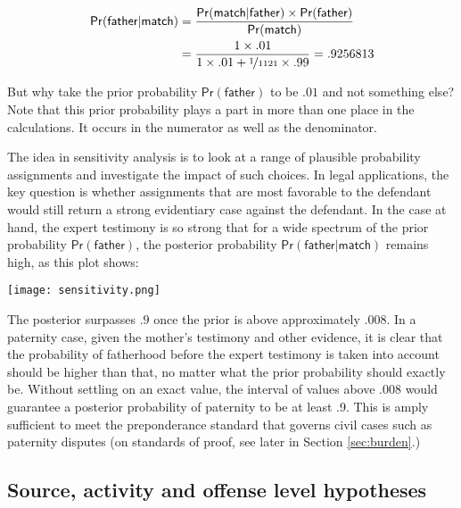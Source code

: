 \documentclass{article}
\newcommand{\pr}{\mathsf{Pr}}
\begin{document}
\begin{align*}
\pr(\textsf{father}\vert \textsf{match}) & = 
	\frac{
		\pr(\textsf{match}\vert \textsf{father}) \times \pr(\textsf{father})
		}
		{
		\pr(\textsf{match})
		} \\ &=
	\frac{
		1 \times  .01
	}
	{
		1 \times .01 + \nicefrac{1}{1121} \times .99
		}	= .9256813
	\end{align*}

\noindent But why take the prior probability $\pr(\textsf{father})$ to be $.01$ and not something else?
Note that this prior probability plays a part in more than one place in the calculations. It occurs in the numerator as well as the denominator. 
%

The idea in sensitivity analysis is to look at a range of plausible probability assignments and investigate the impact of such choices.
In legal applications, the key question is whether assignments that are most favorable to the defendant would still return a strong evidentiary case against the defendant. 
In the case at hand, the expert testimony is so strong that for a wide spectrum of the prior probability $\pr(\textsf{father})$, the posterior probability $\pr(\textsf{father} \vert \textsf{match})$ remains high, as this plot shows:
%
\begin{center}
	\texttt{[image: sensitivity.png]}
\end{center}
%
\noindent The posterior surpasses $.9$ once the prior is above approximately $.008$. In a paternity case, given the mother's testimony and other evidence, it is clear that the probability of fatherhood before the expert testimony is taken into account should be higher than that, no matter what the prior probability should exactly be. Without settling on an exact value, the interval of values above .008 would guarantee a posterior probability of paternity to be at least .9. This is amply sufficient to meet the preponderance standard that governs civil cases such as paternity disputes (on standards of proof, see later in Section \ref{sec:burden}.) 







\subsection{Source, activity and offense level hypotheses}
 \label{subsec:levels}
\end{document}
